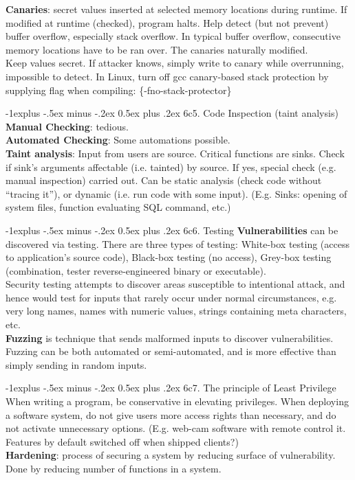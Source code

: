 \documentclass[10pt, landscape]{article}
\makeatletter
\renewcommand{\subsection}{\@startsection{subsection}{2}{0mm}%
                                {-1explus -.5ex minus -.2ex}%
                                {0.5ex plus .2ex}%
                                {\normalfont\normalsize\bfseries}}
\makeatother
\begin{document}
\begin{multicols*}{3}
\textbf{Canaries}: secret values inserted at selected memory locations during runtime. If modified at runtime (checked), program halts.  Help detect (but not prevent) buffer overflow, especially stack overflow. In typical buffer overflow, consecutive memory locations have to be ran over. The canaries naturally modified. \\

Keep values secret. If attacker knows, simply write to canary while overrunning, impossible to detect. In Linux, turn off gcc canary-based stack protection by supplying flag when compiling: \{-fno-stack-protector\}

\subsection{6c5. Code Inspection (taint analysis)}
\textbf{Manual Checking}: tedious.\\
\textbf{Automated Checking}: Some automations possible. \\
\textbf{Taint analysis}: Input from users are source. Critical functions are sinks. Check if sink’s arguments affectable (i.e. tainted) by source. If yes, special check (e.g. manual inspection) carried out. Can be static analysis (check code without “tracing it”), or dynamic (i.e. run code with some input). (E.g. Sinks: opening of system files, function evaluating SQL command, etc.)

\subsection{6c6. Testing}
\textbf{Vulnerabilities} can be discovered via testing. There are three types of testing: White-box testing (access to application’s source code), Black-box testing (no access), Grey-box testing (combination, tester reverse-engineered binary or executable). \\
Security testing attempts to discover areas susceptible to intentional attack, and hence would test for inputs that rarely occur under normal circumstances, e.g. very long names, names with numeric values, strings containing meta characters, etc. \\
\textbf{Fuzzing} is technique that sends malformed inputs to discover vulnerabilities. Fuzzing can be both automated or semi-automated, and is more effective than simply sending in random inputs.

\subsection{6c7. The principle of Least Privilege}
When writing a program, be conservative in elevating privileges. When deploying a software system, do not give users more access 
rights than necessary, and do not activate unnecessary options. (E.g. web-cam software with remote control it. Features by default switched off when shipped clients?) \\
\textbf{Hardening}: process of securing a system by reducing surface of vulnerability. Done by reducing number of functions in a system.



\end{multicols*}
\end{document}
